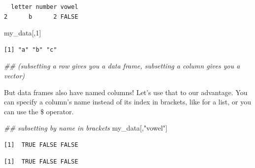 \documentclass[
  letterpaper,
  DIV=11,
  numbers=noendperiod]{scrreprt}
\newenvironment{Shaded}{\begin{snugshade}}{\end{snugshade}}
\newcommand{\DecValTok}[1]{\textcolor[rgb]{0.68,0.00,0.00}{#1}}
\newcommand{\DocumentationTok}[1]{\textcolor[rgb]{0.37,0.37,0.37}{\textit{#1}}}
\newcommand{\FunctionTok}[1]{\textcolor[rgb]{0.28,0.35,0.67}{#1}}
\newcommand{\NormalTok}[1]{\textcolor[rgb]{0.00,0.23,0.31}{#1}}
\newcommand{\SpecialCharTok}[1]{\textcolor[rgb]{0.37,0.37,0.37}{#1}}
\newcommand{\StringTok}[1]{\textcolor[rgb]{0.13,0.47,0.30}{#1}}
\begin{document}
\begin{verbatim}
  letter number vowel
2      b      2 FALSE
\end{verbatim}

\begin{Shaded}
\begin{Highlighting}[]
\NormalTok{my\_data[,}\DecValTok{1}\NormalTok{]}
\end{Highlighting}
\end{Shaded}

\begin{verbatim}
[1] "a" "b" "c"
\end{verbatim}

\begin{Shaded}
\begin{Highlighting}[]
\DocumentationTok{\#\# (subsetting a row gives you a data frame, subsetting a column gives you a vector)}
\end{Highlighting}
\end{Shaded}

But data frames also have named columns! Let's use that to our
advantage. You can specify a column's name instead of its index in
brackets, like for a list, or you can use the \$ operator.

\begin{Shaded}
\begin{Highlighting}[]
\DocumentationTok{\#\# subsetting by name in brackets}
\NormalTok{my\_data[,}\StringTok{"vowel"}\NormalTok{]}
\end{Highlighting}
\end{Shaded}

\begin{verbatim}
[1]  TRUE FALSE FALSE
\end{verbatim}

\begin{Shaded}
\end{Shaded}

\begin{verbatim}
[1]  TRUE FALSE FALSE
\end{verbatim}

\begin{Shaded}
\end{Shaded}
\end{document}

